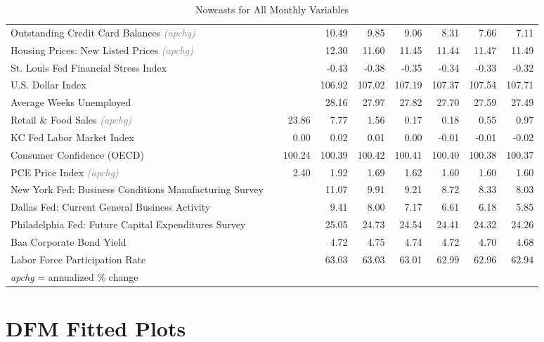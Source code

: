 \documentclass[11pt, letterpaper]{article}\usepackage[]{graphicx}\usepackage[]{color}
\begin{document}
\begin{table}[H]
\begin{tabular}{lrrrrrrrr}
  Outstanding Credit Card Balances \textit{\footnotesize\textcolor{gray}{(apchg)}} &  &  & 10.49 & 9.85 & 9.06 & 8.31 & 7.66 & 7.11 \\ 
  Housing Prices: New Listed Prices \textit{\footnotesize\textcolor{gray}{(apchg)}} &  &  & 12.30 & 11.60 & 11.45 & 11.44 & 11.47 & 11.49 \\ 
  St. Louis Fed Financial Stress Index &  &  & -0.43 & -0.38 & -0.35 & -0.34 & -0.33 & -0.32 \\ 
  U.S. Dollar Index &  &  & 106.92 & 107.02 & 107.19 & 107.37 & 107.54 & 107.71 \\ 
  Average Weeks Unemployed &  &  & 28.16 & 27.97 & 27.82 & 27.70 & 27.59 & 27.49 \\ 
  Retail \& Food Sales \textit{\footnotesize\textcolor{gray}{(apchg)}} &  & 23.86 & 7.77 & 1.56 & 0.17 & 0.18 & 0.55 & 0.97 \\ 
  KC Fed Labor Market Index &  & 0.00 & 0.02 & 0.01 & 0.00 & -0.01 & -0.01 & -0.02 \\ 
  Consumer Confidence (OECD) &  & 100.24 & 100.39 & 100.42 & 100.41 & 100.40 & 100.38 & 100.37 \\ 
  PCE Price Index \textit{\footnotesize\textcolor{gray}{(apchg)}} &  & 2.40 & 1.92 & 1.69 & 1.62 & 1.60 & 1.60 & 1.60 \\ 
  New York Fed: Business Conditions Manufacturing Survey &  &  & 11.07 & 9.91 & 9.21 & 8.72 & 8.33 & 8.03 \\ 
  Dallas Fed: Current General Business Activity &  &  & 9.41 & 8.00 & 7.17 & 6.61 & 6.18 & 5.85 \\ 
  Philadelphia Fed: Future Capital Expenditures Survey &  &  & 25.05 & 24.73 & 24.54 & 24.41 & 24.32 & 24.26 \\ 
  Baa Corporate Bond Yield &  &  & 4.72 & 4.75 & 4.74 & 4.72 & 4.70 & 4.68 \\ 
  Labor Force Participation Rate &  &  & 63.03 & 63.03 & 63.01 & 62.99 & 62.96 & 62.94 \\ 
   \hline 
 \textit{apchg} = annualized \% change 
\end{tabular}
\endgroup
\caption{Nowcasts for All Monthly Variables} 
\end{table}



\appendix
\appendixpage
\addappheadtotoc

\section{DFM Fitted Plots}
\end{document}
